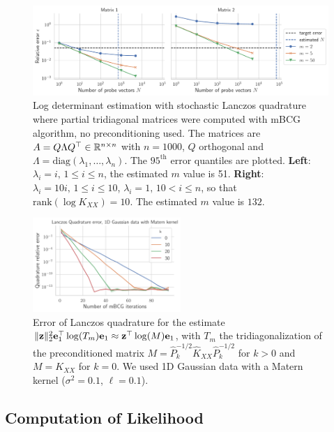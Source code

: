 \documentclass{article}
\begin{document}
\begin{figure}
    \centering
    \includegraphics[width=\textwidth]{res/logdet_mbcg.pdf}
    \caption{Log determinant estimation with stochastic Lanczos quadrature where partial tridiagonal matrices were computed with mBCG algorithm, no preconditioning used. The matrices are $A = Q \Lambda Q^\top \in \mathbb R^{n \times n}$ with $n=1000$, $Q$ orthogonal and $\Lambda = \text{diag}(\lambda_1, \ldots, \lambda_n)$. The $95^\text{th}$ error quantiles are plotted. \textbf{Left}: $\lambda_i = i, \, 1 \le i \le n$, the estimated $m$ value is 51. \textbf{Right}: $\lambda_i = 10i, \, 1 \le i \le 10$, $\lambda_i = 1, \, 10 < i \le n$, so that $\text{rank}(\log K_{XX}) = 10$. The estimated $m$ value is $132$.}
    \label{fig:logdet_mbcg}
\end{figure}


\begin{figure}
    \centering
    \includegraphics[width=0.5\textwidth]{report/res/quadrature_1d_gaussian_matern.pdf}
    \caption{Error of Lanczos quadrature for the estimate $\Vert \boldsymbol{\mathbf{z}} \Vert_2^2 \boldsymbol{\mathbf{e}}_1^\top \log(T_m) \boldsymbol{\mathbf{e}}_1 \approx \boldsymbol{\mathbf{z}}^\top \log(M) \boldsymbol{\mathbf{e}}_1$, with $T_m$ the tridiagonalization of the preconditioned matrix $M = \widehat P_k^{-1/2} \widehat K_{XX} \widehat P_k^{-1/2}$ for $k > 0$ and $M = K_{XX}$ for $k=0$. We used 1D Gaussian data with a Matern kernel ($\sigma^2 = 0.1$, $\ell = 0.1$).}
    \label{fig:quadrature}
\end{figure}


\subsection{Computation of Likelihood}
\end{document}
